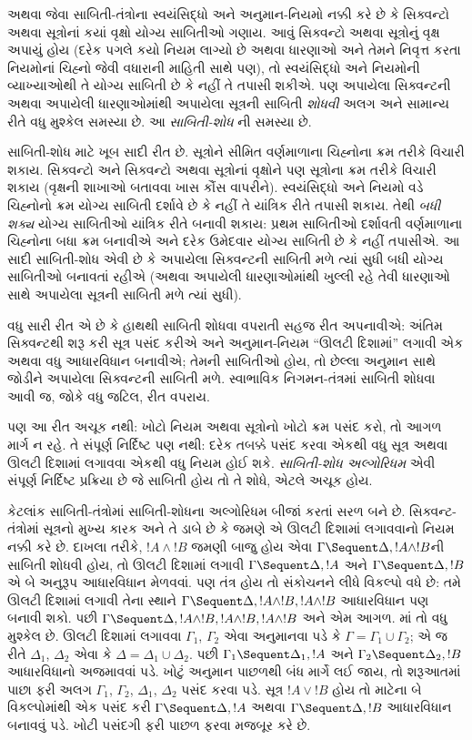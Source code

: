  અથવા
 જેવા
સાબિતી-તંત્રોના
સ્વયંસિદ્ધો અને
અનુમાન-નિયમો
નક્કી કરે છે
કે સિક્વન્ટો
અથવા સૂત્રોનાં
કયાં વૃક્ષો
યોગ્ય સાબિતીઓ
ગણાય. આવું
સિક્વન્ટો અથવા
સૂત્રોનું
વૃક્ષ અપાયું
હોય (દરેક
પગલે કયો નિયમ
લાગ્યો છે
અથવા ધારણાઓ
અને તેમને
નિવૃત્ત કરતા
નિયમોનાં
ચિહ્નો જેવી
વધારાની માહિતી
સાથે પણ),
તો સ્વયંસિદ્ધો
અને નિયમોની
વ્યાખ્યાઓથી
તે યોગ્ય
સાબિતી છે
કે નહીં તે
તપાસી શકીએ.
પણ અપાયેલા
સિક્વન્ટની
અથવા અપાયેલી
ધારણાઓમાંથી
અપાયેલા
સૂત્રની
સાબિતી
\emph{શોધવી}
અલગ અને
સામાન્ય રીતે
વધુ મુશ્કેલ
સમસ્યા છે.
આ \emph{સાબિતી-શોધ}
ની સમસ્યા છે.

સાબિતી-શોધ માટે
ખૂબ સાદી
રીત છે.
સૂત્રોને
સીમિત વર્ણમાળાના
ચિહ્નોના ક્રમ
તરીકે વિચારી
શકાય. સિક્વન્ટો
અને સિક્વન્ટો
અથવા
સૂત્રોનાં
વૃક્ષોને પણ
સૂત્રોના
ક્રમ તરીકે
વિચારી શકાય
(વૃક્ષની શાખાઓ
બતાવવા ખાસ
કૌંસ વાપરીને).
સ્વયંસિદ્ધો
અને નિયમો
વડે ચિહ્નોનો
ક્રમ યોગ્ય
સાબિતી
દર્શાવે છે
કે નહીં તે
યાંત્રિક રીતે
તપાસી શકાય.
તેથી \emph{બધી
શક્ય} યોગ્ય
સાબિતીઓ
યાંત્રિક રીતે
બનાવી શકાય:
પ્રથમ સાબિતીઓ
દર્શાવતી
વર્ણમાળાના
ચિહ્નોના બધા
ક્રમ બનાવીએ
અને દરેક
ઉમેદવાર યોગ્ય
સાબિતી છે
કે નહીં તપાસીએ.
આ સાદી
સાબિતી-શોધ
એવી છે કે
અપાયેલા સિક્વન્ટની
સાબિતી મળે
ત્યાં સુધી
બધી યોગ્ય
સાબિતીઓ
બનાવતાં રહીએ
(અથવા અપાયેલી
ધારણાઓમાંથી
ખુલ્લી રહે
તેવી ધારણાઓ
સાથે અપાયેલા
સૂત્રની
સાબિતી મળે
ત્યાં સુધી).

વધુ સારી
રીત એ છે
કે હાથથી
સાબિતી
શોધવા વપરાતી
સહજ રીત
અપનાવીએ:
અંતિમ સિક્વન્ટથી
શરૂ કરી
સૂત્ર
પસંદ કરીએ
અને અનુમાન-નિયમ
``ઊલટી દિશામાં''
લગાવી એક
અથવા વધુ
આધારવિધાન
બનાવીએ; તેમની
સાબિતીઓ
હોય, તો
છેલ્લા અનુમાન
સાથે જોડીને
અપાયેલા સિક્વન્ટની
સાબિતી
મળે. સ્વાભાવિક
નિગમન-તંત્રમાં
સાબિતી
શોધવા આવી
જ, જોકે
વધુ જટિલ,
રીત વપરાય.

પણ આ રીત
અચૂક નથી:
ખોટો નિયમ
અથવા
સૂત્રોનો
ખોટો ક્રમ
પસંદ કરો,
તો આગળ
માર્ગ ન
રહે. તે
સંપૂર્ણ નિર્દિષ્ટ
પણ નથી:
દરેક તબક્કે
પસંદ કરવા
એકથી વધુ
સૂત્ર
અથવા ઊલટી
દિશામાં
લગાવવા એકથી
વધુ નિયમ
હોઈ શકે.
\emph{સાબિતી-શોધ
અલ્ગોરિધમ}
એવી સંપૂર્ણ
નિર્દિષ્ટ
પ્રક્રિયા છે
જે સાબિતી
હોય તો
તે શોધે,
એટલે અચૂક
હોય.

કેટલાંક
સાબિતી-તંત્રોમાં
સાબિતી-શોધના
અલ્ગોરિધમ
બીજાં કરતાં
સરળ બને છે.
સિક્વન્ટ-તંત્રોમાં
સૂત્રનો
મુખ્ય કારક
અને તે ડાબે
છે કે જમણે
એ ઊલટી
દિશામાં લગાવવાનો
નિયમ નક્કી
કરે છે.
દાખલા તરીકે,
$!A \land
!B$ જમણી
બાજુ હોય એવા
$\Gamma \Sequent \Delta, !A \land !B$ની
સાબિતી
શોધવી હોય,
તો
\RightR{\land}
ઊલટી દિશામાં
લગાવી
$\Gamma \Sequent \Delta, !A$
અને
$\Gamma \Sequent \Delta, !B$
એ બે અનુરૂપ
આધારવિધાન
મેળવવાં.
પણ તંત્ર
હોય તો
સંકોચનને લીધે
વિકલ્પો વધે
છે: તમે
\RightR{\Contraction}
ઊલટી દિશામાં
લગાવી તેના
સ્થાને
$\Gamma \Sequent \Delta, !A \land
!B, !A \land !B$
આધારવિધાન
પણ બનાવી
શકો. પછી
$\Gamma \Sequent
\Delta, !A \land !B, !A \land !B, !A \land !B$
અને એમ
આગળ.
માં
તો વધુ
મુશ્કેલ છે.
\RightR{\land}
ઊલટી દિશામાં
લગાવવા
$\Gamma_1$,
$\Gamma_2$
એવા અનુમાનવા
પડે કે
$\Gamma
= \Gamma_1 \cup \Gamma_2$;
એ જ રીતે
$\Delta_1$,
$\Delta_2$
એવા કે
$\Delta
= \Delta_1 \cup \Delta_2$.
પછી
$\Gamma_1 \Sequent \Delta_1, !A$
અને
$\Gamma_2 \Sequent \Delta_2, !B$
આધારવિધાનો
અજમાવવાં
પડે. ખોટું
અનુમાન પાછળથી
બંધ માર્ગે
લઈ જાય,
તો શરૂઆતમાં
પાછા ફરી
અલગ
$\Gamma_1$,
$\Gamma_2$,
$\Delta_1$,
$\Delta_2$
પસંદ કરવા
પડે.
સૂત્ર
$!A \lor !B$
હોય તો
\RightR{\lor}
માટેના બે
વિકલ્પોમાંથી
એક પસંદ
કરી
$\Gamma \Sequent \Delta,
!A$
અથવા
$\Gamma \Sequent \Delta, !B$
આધારવિધાન
બનાવવું પડે.
ખોટી પસંદગી
ફરી પાછળ
ફરવા મજબૂર
કરે છે.

